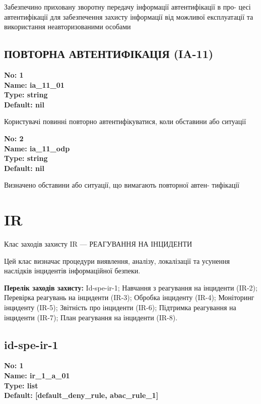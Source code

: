 \documentclass{article}
\begin{document}
{\footnotesize Забезпечино приховану зворотну передачу інформації автентифікації в про- цесі автентифікації для забезпечення захисту інформації від можливої експлуатації та використання неавторизованими особами}




\subsection{ПОВТОРНА АВТЕНТИФІКАЦІЯ (IA-11)}


\vspace{10pt}
{\footnotesize\bfseries
No: 1\\
Name: ia\_\allowbreak{}11\_\allowbreak{}01\\
Type: string\\
Default: nil
}

{\footnotesize Користувачі повинні повторно автентифікуватися, коли обставини або ситуації}


{\footnotesize\bfseries
No: 2\\
Name: ia\_\allowbreak{}11\_\allowbreak{}odp\\
Type: string\\
Default: nil
}

{\footnotesize Визначено обставини або ситуації, що вимагають повторної автен- тифікації}




\section{IR}
Клас заходів захисту IR --- РЕАГУВАННЯ НА ІНЦИДЕНТИ

Цей клас визначає процедури виявлення, аналізу, локалізації та усунення наслідків інцидентів інформаційної безпеки.

\textbf{Перелік заходів захисту:} Id-spe-ir-1; Навчання з реагування на інциденти (IR-2); Перевірка реагувань на інциденти (IR-3); Обробка інциденту (IR-4); Моніторинг інциденту (IR-5); Звітність про інциденти (IR-6); Підтримка реагування на інциденти (IR-7); План реагування на інциденти (IR-8).

\subsection{id-spe-ir-1}


\vspace{10pt}
{\footnotesize\bfseries
No: 1\\
Name: ir\_\allowbreak{}1\_\allowbreak{}a\_\allowbreak{}01\\
Type: list\\
Default: [\textquotedbl{}default\_\allowbreak{}deny\_\allowbreak{}rule\textquotedbl{}, \textquotedbl{}abac\_\allowbreak{}rule\_\allowbreak{}1\textquotedbl{}]
}
\end{document}
